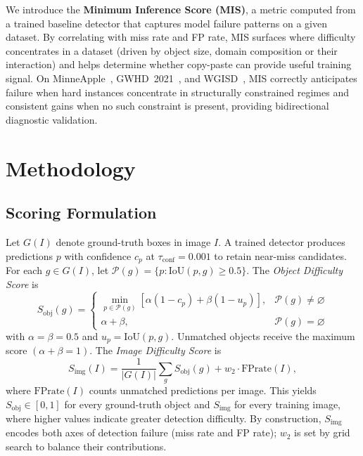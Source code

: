 \documentclass[conference]{IEEEtran}
\begin{document}
We introduce the \textbf{Minimum Inference Score (MIS)}, a
metric computed from a trained baseline detector that captures
model failure patterns on a given dataset.
By correlating with miss rate and FP rate, MIS surfaces where difficulty
concentrates in a dataset (driven by object size, domain composition or their interaction) 
and helps determine whether copy-paste can provide
useful training signal. 
On MinneApple~\cite{hani2020minneapple},
GWHD~2021~\cite{david2021global}, and
WGISD~\cite{santos2020grape}, MIS correctly anticipates failure when
hard instances concentrate in structurally constrained regimes and
consistent gains when no such constraint is present,
providing bidirectional diagnostic validation.

\section{Methodology}
\subsection{Scoring Formulation}

Let $G(I)$ denote ground-truth boxes in image $I$.
A trained detector produces predictions $p$ with confidence $c_p$ at
$\tau_{\mathrm{conf}}{=}0.001$ to retain near-miss candidates.
For each $g\in G(I)$, let
$\mathcal{P}(g){=}\{p:\mathrm{IoU}(p,g){\ge}0.5\}$.
The \textit{Object Difficulty Score} is
\begin{equation}
S_{\mathrm{obj}}(g) =
\begin{cases}
  \min_{p \in \mathcal{P}(g)}\!
    [\alpha(1{-}c_p) + \beta(1{-}u_p)],
    & \mathcal{P}(g) \neq \varnothing \\[2pt]
  \alpha + \beta, & \mathcal{P}(g) = \varnothing
\end{cases}
\label{eq:obj}
\end{equation}
with $\alpha{=}\beta{=}0.5$ and $u_p{=}\mathrm{IoU}(p,g)$.
Unmatched objects receive the maximum score $(\alpha{+}\beta{=}1)$.
The \textit{Image Difficulty Score} is
\begin{equation}
S_{\mathrm{img}}(I)
  = \frac{1}{|G(I)|}\sum_{g} S_{\mathrm{obj}}(g)
  + w_2 \cdot \mathrm{FPrate}(I),
\label{eq:img}
\end{equation}
where $\mathrm{FPrate}(I)$ counts unmatched predictions per image.
This yields $S_{\mathrm{obj}} \in [0,1]$ for every ground-truth object
and $S_{\mathrm{img}}$ for every training image, where higher values
indicate greater detection difficulty.
By construction, $S_{\mathrm{img}}$ encodes both axes of detection
failure (miss rate and FP rate); $w_2$ is set by grid search to
balance their contributions.
\end{document}
